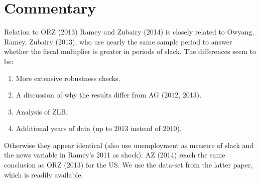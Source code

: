 \documentclass{beamer}
\begin{document}
\section{Commentary}
\label{sec:commentary}

\begin{frame}{Relation to ORZ (2013)}
  Ramey and Zubairy (2014) is closely related to Owyang, Ramey, Zubairy (2013), who use nearly the same sample period to answer whether the fiscal multiplier is greater in periods of slack. The differences seem to be:
  \begin{enumerate}
    \item More extensive robustness checks.

    \item A discussion of why the results differ from AG (2012, 2013).

    \item Analysis of ZLB.

    \item Additional years of data (up to 2013 instead of 2010).
  \end{enumerate}

  Otherwise they appear identical (also use unemployment as measure of slack and the news variable in Ramey's 2011 as shock). AZ (2014) reach the same conclusion as ORZ (2013) for the US. We use the data-set from the latter paper, which is readily available.
\end{frame}
\end{document}
